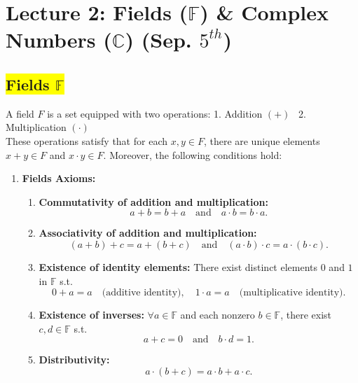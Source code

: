 \section*{Lecture 2: Fields ($\mathbb{F}$) \& Complex Numbers ($\mathbb{C}$) (Sep. $5^{th}$)}


\subsection*{\colorbox{yellow}{Fields $\mathbb{F}$}}
\qquad A field $F$ is a set equipped with two operations: 1. Addition $(+)$ \, 2. Multiplication $(\cdot)$\\
\qquad These operations satisfy that for each $x, y \in F$, there are unique elements $x + y \in F$ and $x \cdot y \in F$. Moreover, the following conditions hold:

\begin{enumerate}
    \item \textbf{Fields Axioms:}
            \begin{enumerate}
                \item \textbf{Commutativity of addition and multiplication:}
                    \[ a + b = b + a \quad \text{and} \quad a \cdot b = b \cdot a.\]
                
                \item \textbf{Associativity of addition and multiplication:}
                    \[(a + b) + c = a + (b + c) \quad \text{and} \quad (a \cdot b) \cdot c = a \cdot (b \cdot c).\]
                
                \item \textbf{Existence of identity elements:} There exist distinct elements $0$ and $1$ in $\mathbb{F}$ s.t.
                    \[ 0 + a = a \quad \text{(additive identity)}, \quad 1 \cdot a = a \quad \text{(multiplicative identity)}.\]
                
                \item \textbf{Existence of inverses:} $\forall a \in\mathbb{F}$ and each nonzero $b \in \mathbb{F}$, there exist $c, d \in \mathbb{F}$ s.t.
                    \[a + c = 0 \quad \text{and} \quad b \cdot d = 1.\]
                
                \item \textbf{Distributivity:}
                    \[a \cdot (b + c) = a \cdot b + a \cdot c.\]
            \end{enumerate}


\end{enumerate}
